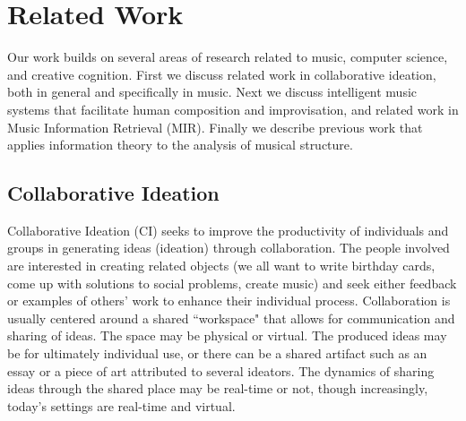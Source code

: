 \documentclass[final,authoryear,11pt,times]{elsarticle}
\begin{document}
\section{Related Work}

Our work builds on several areas of research related to music, computer science, and creative cognition. First we discuss related work in collaborative ideation, both in general and specifically in music. Next we discuss intelligent 
music systems that facilitate human composition and improvisation, and related work in Music Information Retrieval (MIR). Finally we describe previous work that applies information theory to the analysis of musical structure.


\subsection{Collaborative Ideation}

Collaborative Ideation (CI) seeks to improve the productivity of individuals and groups in generating ideas (ideation) through collaboration. The people involved are interested in creating related objects (we all want to write birthday cards, come up with solutions to social problems, create music) and seek either feedback or examples of others' work to enhance their individual process. Collaboration is usually centered around a shared ``workspace" that allows for communication and sharing of ideas. The space may be physical or virtual. The produced ideas may be for ultimately individual use, or there can be a shared artifact such as an essay or a piece of art attributed to several ideators. The dynamics of sharing ideas through the shared place may be real-time or not, though increasingly, today's settings are real-time and virtual.
\end{document}
